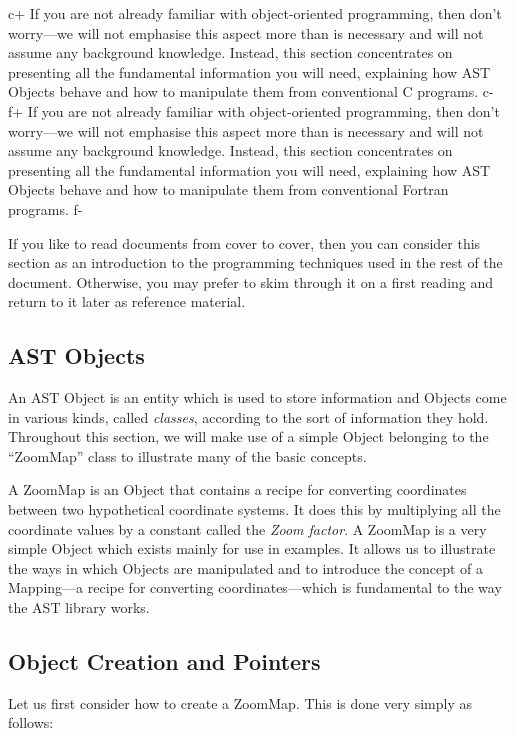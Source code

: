 \documentclass[twoside,11pt]{starlink}
\begin{document}
c+
If you are not already familiar with object-oriented programming, then
don't worry---we will not emphasise this aspect more than is necessary
and will not assume any background knowledge.  Instead, this section
concentrates on presenting all the fundamental information you will
need, explaining how AST Objects behave and how to manipulate them
from conventional C programs.
c-
f+
If you are not already familiar with object-oriented programming, then
don't worry---we will not emphasise this aspect more than is necessary
and will not assume any background knowledge.  Instead, this section
concentrates on presenting all the fundamental information you will
need, explaining how AST Objects behave and how to manipulate them
from conventional Fortran programs.
f-

If you like to read documents from cover to cover, then you can
consider this section as an introduction to the programming techniques
used in the rest of the document. Otherwise, you may prefer to skim
through it on a first reading and return to it later as reference
material.

\subsection{AST Objects}

An AST Object is an entity which is used to store information and
Objects come in various kinds, called \emph{classes}, according to the
sort of information they hold. Throughout this section, we will make
use of a simple Object belonging to the ``ZoomMap'' class to
illustrate many of the basic concepts.

A ZoomMap is an Object that contains a recipe for converting
coordinates between two hypothetical coordinate systems.  It does this
by multiplying all the coordinate values by a constant called the
\emph{Zoom factor}.  A ZoomMap is a very simple Object which exists
mainly for use in examples. It allows us to illustrate the ways in
which Objects are manipulated and to introduce the concept of a
Mapping---a recipe for converting coordinates---which is fundamental
to the way the AST library works.

\subsection{\label{ss:objectcreation}Object Creation and Pointers}

Let us first consider how to create a ZoomMap. This is done very
simply as follows:
\end{document}
